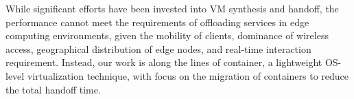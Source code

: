 While significant efforts have been invested into VM synthesis and handoff, the performance cannot meet the requirements of offloading services in edge computing environments, given the mobility of clients, dominance of wireless access, geographical distribution of edge nodes, and real-time interaction requirement. Instead,  our work is along the lines of container, a lightweight OS-level virtualization technique, with focus on the migration of containers to reduce the total handoff time. 





